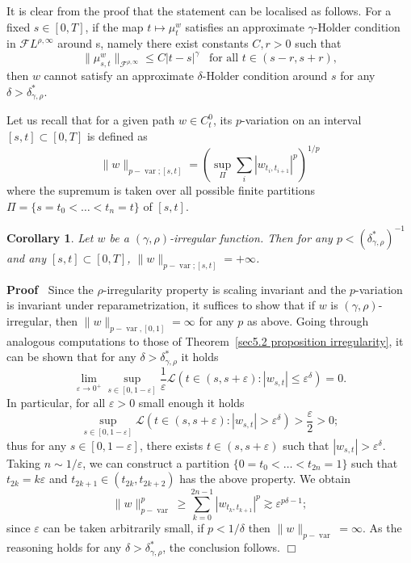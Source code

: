 \documentclass[10pt]{article}
\newcommand{\tmop}[1]{\ensuremath{\operatorname{#1}}}
\newenvironment{proof}{\noindent\textbf{Proof\ }}{\hspace*{\fill}$\Box$\medskip}
\newtheorem{corollary}[theorem]{Corollary}
\begin{document}
\begin{remark}
  It is clear from the proof that the statement can be localised as follows.
  For a fixed $s \in [0, T]$, if the map $t \mapsto \mu^w_t$ satisfies an
  approximate $\gamma$-Holder condition in $\mathcal{F} L^{\rho, \infty}$
  around s, namely there exist constants $C, r > 0$ such that
  \[ \| \mu^w_{s, t} \|_{\mathcal{F}^{\rho, \infty}} \leqslant C | t - s
     |^{\gamma}  \enspace \text{ for all } t \in (s - r, s + r), \]
  then $w$ cannot satisfy an approximate $\delta$-Holder condition around $s$
  for any $\delta > \delta^{\ast}_{\gamma, \rho}$.
\end{remark}

Let us recall that for a given path $w \in C^0_t$, its $p$-variation on an
interval $[s, t] \subset [0, T]$ is defined as
\[ \| w \|_{p - \tmop{var} ; [s, t]} = \left( \sup_{\Pi} \sum_i | w_{t_i, t_{i
   + 1}} |^p \right)^{1 / p} \]
where the supremum is taken over all possible finite partitions $\Pi = \{ s =
t_0 < \ldots < t_n = t \}$ of $[s, t]$.

\begin{corollary}
  Let $w$ be a $(\gamma, \rho)$-irregular function. Then for any $p <
  (\delta^{\ast}_{\gamma, \rho})^{- 1}$ and any $[s, t] \subset [0, T]$, $\| w
  \|_{p - \tmop{var} ; [s, t]} = + \infty$.
\end{corollary}

\begin{proof}
  Since the $\rho$\mbox{-}irregularity property is scaling invariant and the
  $p$\mbox{-}variation is invariant under reparametrization, it suffices to
  show that if $w$ is $(\gamma, \rho)$\mbox{-}irregular, then $\| w \|_{p -
  \tmop{var}, [0, 1]} = \infty$ for any $p$ as above. Going through analogous
  computations to those of Theorem~\ref{sec5.2 proposition irregularity}, it
  can be shown that for any $\delta > \delta^{\ast}_{\gamma, \rho}$ it holds
  \[ \lim_{\varepsilon \rightarrow 0^+} \sup_{s \in [0, 1 - \varepsilon]}
     \frac{1}{\varepsilon} \mathcal{L} (t \in (s, s + \varepsilon) : | w_{s,
     t} | \leqslant \varepsilon^{\delta}) = 0. \]
  In particular, for all $\varepsilon > 0$ small enough it holds
  \[ \sup_{s \in [0, 1 - \varepsilon]} \mathcal{L} (t \in (s, s + \varepsilon)
     : | w_{s, t} | > \varepsilon^{\delta}) > \frac{\varepsilon}{2} > 0 ; \]
  thus for any $s \in [0, 1 - \varepsilon]$, there exists $t \in (s, s +
  \varepsilon)$ such that $| w_{s, t} | > \varepsilon^{\delta}$. Taking $n
  \sim 1 / \varepsilon$, we can construct a partition $\{ 0 = t_0 < \ldots <
  t_{2 n} = 1 \}$ such that $t_{2 k} = k \varepsilon$ and $t_{2 k + 1} \in
  (t_{2 k}, t_{2 k + 2})$ has the above property. We obtain
  \[ \| w \|_{p - \tmop{var}}^p \geqslant \sum_{k = 0}^{2 n - 1} | w_{t_k,
     t_{k + 1}} |^p \gtrsim \varepsilon^{p \delta - 1} ; \]
  since $\varepsilon$ can be taken arbitrarily small, if $p < 1 / \delta$ then
  $\| w \|_{p - \tmop{var}} = \infty$. As the reasoning holds for any $\delta
  > \delta^{\ast}_{\gamma, \rho}$, the conclusion follows.
\end{proof}
\end{document}
